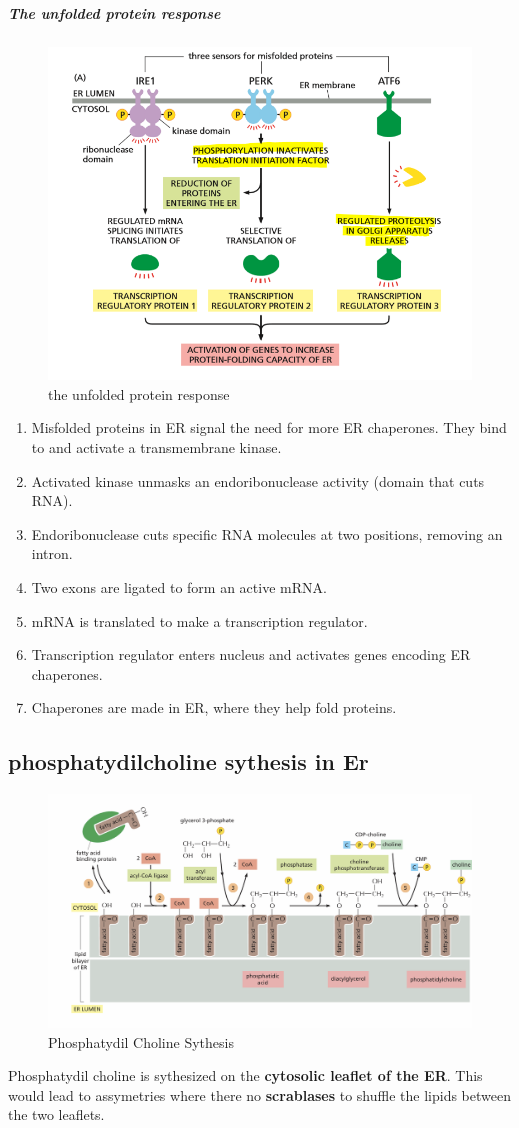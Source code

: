 \documentclass[../main.tex]{subfiles}
\begin{document}
\subparagraph{The unfolded protein response}
\begin{figure}[H]
    \centering
    \includegraphics[width=\linewidth]{UnfoldedProteinResponse.png}
    \caption{the unfolded protein response}
    \label{fig:enter-label}
\end{figure}
\begin{enumerate}
    \item Misfolded proteins in ER signal the need for more ER chaperones. They bind to and activate a transmembrane kinase.
    \item Activated kinase unmasks an endoribonuclease activity (domain that cuts RNA).
    \item Endoribonuclease cuts specific RNA molecules at two positions, removing an intron.
    \item Two exons are ligated to form an active mRNA.
    \item mRNA is translated to make a transcription regulator.
    \item Transcription regulator enters nucleus and activates genes encoding ER chaperones.
    \item Chaperones are made in ER, where they help fold proteins.
\end{enumerate}

\subsection{phosphatydilcholine sythesis in Er}
\begin{figure}[H]
    \centering
    \includegraphics[width=0.5\linewidth]{phosphatydilCholineSynthesis.png}
    \caption{Phosphatydil Choline Sythesis}
    \label{fig:enter-label}
\end{figure}
Phosphatydil choline is sythesized on the \textbf{cytosolic leaflet of the ER}. This would lead to assymetries where there no \textbf{scrablases} to shuffle the lipids between the two leaflets.
\end{document}
